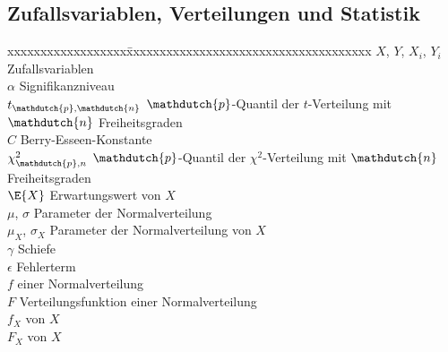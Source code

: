 \subsection*{Zufallsvariablen, Verteilungen und Statistik}
\begin{tabbing}
xxxxxxxxxxxxxxxxxx\=xxxxxxxxxxxxxxxxxxxxxxxxxxxxxxxxxxxxx\kill
$X$, $Y$, $X_i$, $Y_i$ \>Zufallsvariablen \\
$\alpha$ \>Signifikanzniveau \\
$t_{\mathdutch{p}, \mathdutch{n}}$ \>$\mathdutch{p}$-Quantil der $t$-Verteilung mit $\mathdutch{n}$ Freiheitsgraden \\
$C$ \>Berry-Esseen-Konstante \\
$\chi^2_{\mathdutch{p}, n}$ \>$\mathdutch{p}$-Quantil der $\chi^2$-Verteilung mit $\mathdutch{n}$ Freiheitsgraden \\
$\E{X}$ \>Erwartungswert von $X$ \\
$\mu$, $\sigma$ \>Parameter der Normalverteilung \\
$\mu_X$, $\sigma_X$ \>Parameter der Normalverteilung von $X$ \\
$\gamma$ \>Schiefe \\
$\epsilon$ \>Fehlerterm \\
$f$ \>\pdf einer Normalverteilung \\
$F$ \>Verteilungsfunktion einer Normalverteilung \\
$f_X$ \>\pdf von $X$ \\
$F_X$ \>\cdf von $X$ \\
\end{tabbing}

